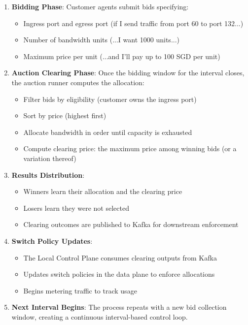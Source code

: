\begin{enumerate}
    \item \textbf{Bidding Phase}: Customer agents submit bids specifying:
    \begin{itemize}
        \item Ingress port and egress port (if I send traffic from port 60 to port 132...)
        \item Number of bandwidth units (...I want 1000 units...)
        \item Maximum price per unit (...and I'll pay up to 100 SGD per unit)
    \end{itemize}
    
    \item \textbf{Auction Clearing Phase}: Once the bidding window for the interval closes, the auction runner computes the allocation:
    \begin{itemize}
        \item Filter bids by eligibility (customer owns the ingress port)
        \item Sort by price (highest first)
        \item Allocate bandwidth in order until capacity is exhausted
        \item Compute clearing price: the maximum price among winning bids (or a variation thereof)
    \end{itemize}
    
    \item \textbf{Results Distribution}:
    \begin{itemize}
        \item Winners learn their allocation and the clearing price
        \item Losers learn they were not selected
        \item Clearing outcomes are published to Kafka for downstream enforcement
    \end{itemize}
    
    \item \textbf{Switch Policy Updates}:
    \begin{itemize}
        \item The Local Control Plane consumes clearing outputs from Kafka
        \item Updates switch policies in the data plane to enforce allocations
        \item Begins metering traffic to track usage
    \end{itemize}
    
    \item \textbf{Next Interval Begins}: The process repeats with a new bid collection window, creating a continuous interval-based control loop.
\end{enumerate}

